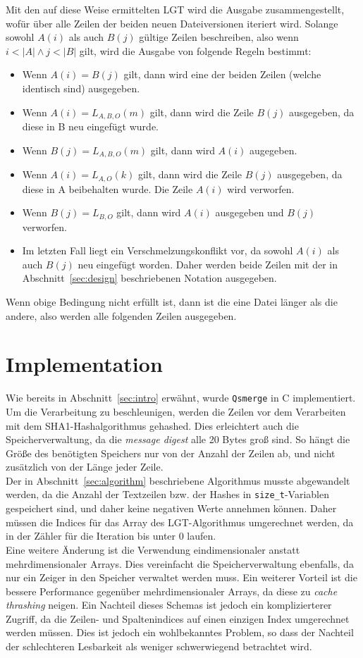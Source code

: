 \documentclass[a4paper,titlepage,12pt]{scrartcl}
\begin{document}
Mit den auf diese Weise ermittelten LGT wird die Ausgabe zusammengestellt,
wofür über alle Zeilen der beiden neuen Dateiversionen iteriert wird.
Solange sowohl $A(i)$ als auch $B(j)$ gültige Zeilen beschreiben,
also wenn $i < |A| \wedge j < |B|$ gilt,
wird die Ausgabe von folgende Regeln bestimmt:
\begin{itemize}
\item Wenn $A(i) = B(j)$ gilt,
dann wird eine der beiden Zeilen (welche identisch sind) ausgegeben.
\item Wenn $A(i) = L_{A,B,O}(m)$ gilt,
dann wird die Zeile $B(j)$ ausgegeben,
da diese in B neu eingefügt wurde.
\item Wenn $B(j) = L_{A,B,O}(m)$ gilt,
dann wird $A(i)$ augegeben.
\item Wenn $A(i) = L_{A,O}(k)$ gilt,
dann wird die Zeile $B(j)$ ausgegeben,
da diese in A beibehalten wurde.
Die Zeile $A(i)$ wird verworfen.
\item Wenn $B(j) = L_{B,O}$ gilt,
dann wird $A(i)$ ausgegeben und $B(j)$ verworfen.
\item Im letzten Fall liegt ein Verschmelzungskonflikt vor,
da sowohl $A(i)$ als auch $B(j)$ neu eingefügt worden.
Daher werden beide Zeilen mit der in Abschnitt~\ref{sec:design} beschriebenen Notation ausgegeben.
\end{itemize}
Wenn obige Bedingung nicht erfüllt ist,
dann ist die eine Datei länger als die andere,
also werden alle folgenden Zeilen ausgegeben.

\section{Implementation}
\label{sec:implementation}
Wie bereits in Abschnitt~\ref{sec:intro} erwähnt,
wurde \texttt{Qsmerge} in C implementiert.
Um die Verarbeitung zu beschleunigen,
werden die Zeilen vor dem Verarbeiten mit dem SHA1-Hashalgorithmus gehashed.
Dies erleichtert auch die Speicherverwaltung,
da die \emph{message digest} alle 20 Bytes groß sind.
So hängt die Größe des benötigten Speichers nur von der Anzahl der Zeilen ab,
und nicht zusätzlich von der Länge jeder Zeile.
\\
Der in Abschnitt~\ref{sec:algorithm} beschriebene Algorithmus musste abgewandelt werden,
da die Anzahl der Textzeilen bzw. der Hashes in \texttt{size\_t}-Variablen gespeichert sind,
und daher keine negativen Werte annehmen können.
Daher müssen die Indices für das Array des LGT-Algorithmus umgerechnet werden,
da in \citet{web:eppstein} der Zähler für die Iteration bis unter 0 laufen.
\\
Eine weitere Änderung ist die Verwendung eindimensionaler anstatt mehrdimensionaler Arrays.
Dies vereinfacht die Speicherverwaltung ebenfalls,
da nur ein Zeiger in den Speicher verwaltet werden muss.
Ein weiterer Vorteil ist die bessere Performance gegenüber mehrdimensionaler Arrays,
da diese zu \emph{cache thrashing} neigen.
Ein Nachteil dieses Schemas ist jedoch ein komplizierterer Zugriff,
da die Zeilen- und Spaltenindices auf einen einzigen Index umgerechnet werden müssen.
Dies ist jedoch ein wohlbekanntes Problem,
so dass der Nachteil der schlechteren Lesbarkeit als weniger schwerwiegend betrachtet wird.
\end{document}
